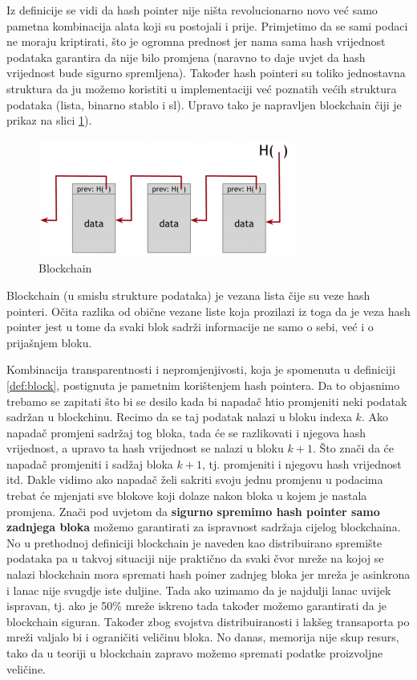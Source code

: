 \documentclass[12pt]{report}
\begin{document}
Iz definicije se vidi da hash pointer nije ništa revolucionarno novo već samo pametna kombinacija alata koji su postojali i prije. Primjetimo da se sami podaci ne moraju kriptirati, što je ogromna prednost jer nama sama hash vrijednost podataka garantira da nije bilo promjena (naravno to daje uvjet da hash vrijednost bude sigurno spremljena). Također hash pointeri su toliko jednostavna struktura da ju možemo koristiti u implementaciji već poznatih većih struktura podataka (lista, binarno stablo i sl). Upravo tako je napravljen blockchain čiji je prikaz na slici \ref{fig:blockchain}).

\begin{figure}[!]
\centering
\includegraphics[scale=0.8]{blockchain}
\caption{Blockchain}
\label{fig:blockchain}
\end{figure}

Blockchain (u smislu strukture podataka) je vezana lista čije su veze hash pointeri. Očita razlika od obične vezane liste koja prozilazi iz toga da je veza hash pointer jest u tome da svaki blok sadrži informacije ne samo o sebi, već i o prijašnjem bloku. 

Kombinacija transparentnosti i nepromjenjivosti, koja je spomenuta u definiciji \ref{def:block}, postignuta je pametnim korištenjem hash pointera. Da to objasnimo trebamo se zapitati što bi se desilo kada bi napadač htio promjeniti neki podatak sadržan u blockchinu. Recimo da se taj podatak nalazi u bloku indexa $k$. Ako napadač promjeni sadržaj tog bloka, tada će se razlikovati i njegova hash vrijednost, a upravo ta hash vrijednost se nalazi u bloku $k+1$. Što znači da će napadač promjeniti i sadžaj bloka $k+1$, tj. promjeniti i njegovu hash vrijednost itd. Dakle vidimo ako napadač želi sakriti svoju jednu promjenu u podacima trebat će mjenjati sve blokove koji dolaze nakon bloka u kojem je nastala promjena. Znači pod uvjetom da \textbf{sigurno spremimo hash pointer samo zadnjega bloka} možemo garantirati za ispravnost sadržaja cijelog blockchaina. No u prethodnoj definiciji blockchain je naveden kao distribuirano spremište podataka pa u takvoj situaciji nije praktično da svaki čvor mreže na kojoj se nalazi blockchain mora spremati hash poiner zadnjeg bloka jer mreža je asinkrona i lanac nije svugdje iste duljine. Tada ako uzimamo da je najdulji lanac uvijek ispravan, tj. ako je 50\% mreže iskreno tada također možemo garantirati da je blockchain siguran. Također zbog svojstva distribuiranosti i lakšeg transaporta po mreži valjalo bi i ograničiti veličinu bloka. No danas, memorija nije skup resurs, tako da u teoriji u blockchain zapravo možemo spremati podatke proizvoljne veličine.
\end{document}
